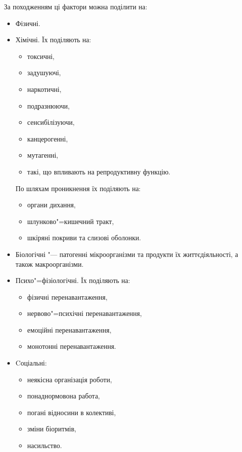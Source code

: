 \documentclass[a4paper,10pt,notitlepage,pdftex,headsepline]{scrartcl}
\begin{document}
  За походженням ці фактори можна поділити на:
  \begin{itemize}
    \item Фізичні.
    \item Хімічні.
      Їх поділяють на:
      \begin{itemize}
        \item токсичні,
        \item задушуючі,
        \item наркотичні,
        \item подразнюючи,
        \item сенсибілізуючи,
        \item канцерогенні,
        \item мутагенні,
        \item такі, що впливають на репродуктивну функцію.
      \end{itemize}

      По шляхам проникнення їх поділяють на:
      \begin{itemize}
        \item органи дихання,
        \item шлунково"=кишечний тракт,
        \item шкіряні покриви та слизові оболонки.
      \end{itemize}
    \item Біологічні "--- патогенні мікроорганізми та продукти їх
      життєдіяльності, а також макроорганізми.
    \item Психо"=фізіологічні.
      Їх поділяють на:
      \begin{itemize}
        \item фізичні перенавантаження,
        \item нервово"=психічні перенавантаження,
        \item емоційні перенавантаження,
        \item монотонні перенавантаження.
      \end{itemize}
    \item Cоціальні:
      \begin{itemize}
        \item неякісна організація роботи,
        \item понаднормовона работа,
        \item погані відносини в колективі,
        \item зміни біоритмів,
        \item насильство.
      \end{itemize}
  \end{itemize}
\end{document}
